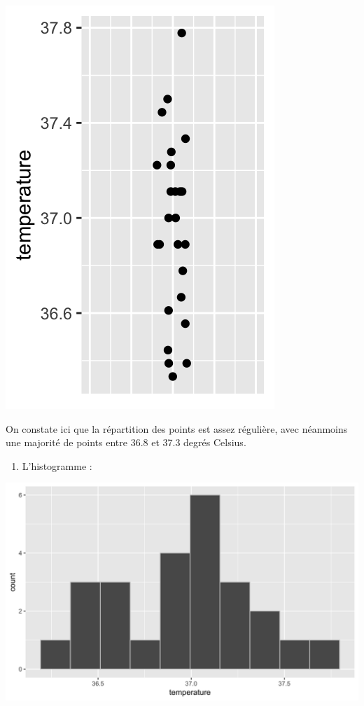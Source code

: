 \documentclass[a4paperpaper,]{article}
\newenvironment{Shaded}{\begin{snugshade}}{\end{snugshade}}
\newcommand{\DataTypeTok}[1]{\textcolor[rgb]{0.00,0.34,0.68}{#1}}
\newcommand{\DecValTok}[1]{\textcolor[rgb]{0.69,0.50,0.00}{#1}}
\newcommand{\FloatTok}[1]{\textcolor[rgb]{0.69,0.50,0.00}{#1}}
\newcommand{\KeywordTok}[1]{\textcolor[rgb]{0.12,0.11,0.11}{\textbf{#1}}}
\newcommand{\NormalTok}[1]{\textcolor[rgb]{0.12,0.11,0.11}{#1}}
\newcommand{\OperatorTok}[1]{\textcolor[rgb]{0.12,0.11,0.11}{#1}}
\newcommand{\StringTok}[1]{\textcolor[rgb]{0.75,0.01,0.01}{#1}}
\providecommand{\tightlist}{%
  \setlength{\itemsep}{0pt}\setlength{\parskip}{0pt}}
\begin{document}
\begin{center}\includegraphics[width=0.25\linewidth]{figure/unnamed-chunk-17-1} \end{center}

On constate ici que la répartition des points est assez régulière, avec néanmoins une majorité de points entre 36.8 et 37.3 degrés Celsius.

\begin{enumerate}
\def\labelenumi{\arabic{enumi}.}
\setcounter{enumi}{1}
\tightlist
\item
  L'histogramme :
\end{enumerate}

\begin{Shaded}
\end{Shaded}

\begin{center}\includegraphics[width=0.9\linewidth]{figure/unnamed-chunk-18-1} \end{center}
\end{document}
